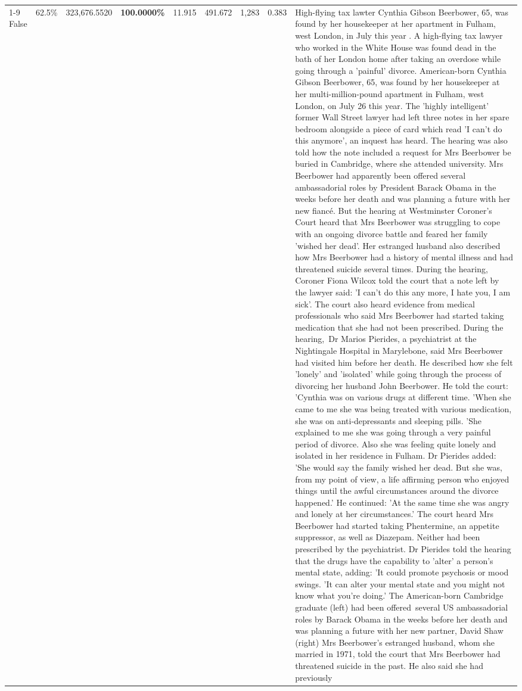 \begin{table}[H]
\begin{tabular}{lllrlllll}
\cline{1-9}
False & 62.5\% & 323,676.5520 & \bfseries \color{red} 100.0000\% & 11.915 & 491.672 & 1,283 & 0.383 & High-flying tax lawter Cynthia Gibson Beerbower, 65, was found by her housekeeper at her apartment in Fulham, west London, in July this year . A high-flying tax lawyer who worked in the White House was found dead in the bath of her London home after taking an overdose while going through a 'painful' divorce. American-born Cynthia Gibson Beerbower, 65, was found by her housekeeper at her multi-million-pound apartment in Fulham, west London, on July 26 this year. The 'highly intelligent' former Wall Street lawyer had left three notes in her spare bedroom alongside a piece of card which read 'I can't do this anymore', an inquest has heard. The hearing was also told how the note included a request for Mrs Beerbower be buried in Cambridge, where she attended university. Mrs Beerbower had apparently been offered several ambassadorial roles by President Barack Obama in the weeks before her death and was planning a future with her new fiancé. But the hearing at Westminster Coroner's Court heard that Mrs Beerbower was struggling to cope with an ongoing divorce battle and feared her family 'wished her dead'. Her estranged husband also described how Mrs Beerbower had a history of mental illness and had threatened suicide several times. During the hearing, Coroner Fiona Wilcox told the court that a note left by the lawyer said: 'I can't do this any more, I hate you, I am sick'. The court also heard evidence from medical professionals who said Mrs Beerbower had started taking medication that she had not been prescribed. During the hearing, Dr Marios Pierides, a psychiatrist at the Nightingale Hospital in Marylebone, said Mrs Beerbower had visited him before her death. He described how she felt 'lonely' and 'isolated' while going through the process of divorcing her husband John Beerbower. He told the court: 'Cynthia was on various drugs at different time. 'When she came to me she was being treated with various medication, she was on anti-depressants and sleeping pills. 'She explained to me she was going through a very painful period of divorce. Also she was feeling quite lonely and isolated in her residence in Fulham. Dr Pierides added: 'She would say the family wished her dead. But she was, from my point of view, a life affirming person who enjoyed things until the awful circumstances around the divorce happened.' He continued: 'At the same time she was angry and lonely at her circumstances.' The court heard Mrs Beerbower had started taking Phentermine, an appetite suppressor, as well as Diazepam. Neither had been prescribed by the psychiatrist. Dr Pierides told the hearing that the drugs have the capability to 'alter' a person's mental state, adding: 'It could promote psychosis or mood swings. 'It can alter your mental state and you might not know what you're doing.' The American-born Cambridge graduate (left) had been offered several US ambassadorial roles by Barack Obama in the weeks before her death and was planning a future with her new partner, David Shaw (right) Mrs Beerbower's estranged husband, whom she married in 1971, told the court that Mrs Beerbower had threatened suicide in the past. He also said she had previously 
\end{tabular}
\end{table}
